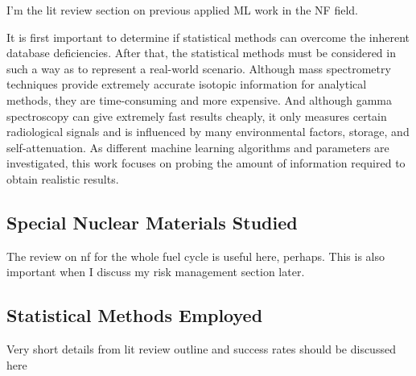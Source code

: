 I'm the lit review section on previous applied ML work in the NF field.

It is first important to determine if statistical methods can overcome the
inherent database deficiencies. After that, the statistical methods must be
considered in such a way as to represent a real-world scenario. Although mass
spectrometry techniques provide extremely accurate isotopic information for
analytical methods, they are time-consuming and more expensive. And although
gamma spectroscopy can give extremely fast results cheaply, it only measures
certain radiological signals and is influenced by many environmental factors,
storage, and self-attenuation. As different machine learning algorithms and
parameters are investigated, this work focuses on probing the amount of
information required to obtain realistic results.


\subsection{Special Nuclear Materials Studied}

The review on nf for the whole fuel cycle is useful here, perhaps. This is also 
important when I discuss my risk management section later. 

\subsection{Statistical Methods Employed}

Very short details from lit review outline and success rates should be 
discussed here

